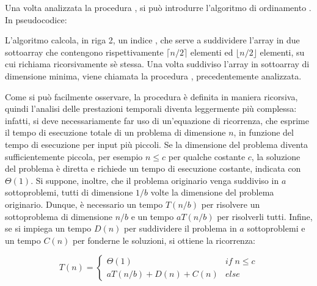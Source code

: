 \vspace{10pt}

Una volta analizzata la procedura , si può introdurre l'algoritmo di ordinamento . In pseudocodice:



L'algoritmo calcola, in riga 2, un indice , che serve a suddividere l'array  in due sottoarray che contengono rispettivamente \(\lceil n/2 \rceil\) elementi ed \(\lfloor n/2 \rfloor\) elementi, su cui richiama ricorsivamente sè stessa. Una volta suddiviso l'array  in sottoarray di dimensione minima, viene chiamata la procedura , precedentemente analizzata. 

Come si può facilmente osservare, la procedura  è definita in maniera ricorsiva, quindi l'analisi delle prestazioni temporali diventa leggermente più complessa: infatti, si deve necessariamente far uso di un'equazione di ricorrenza, che esprime il tempo di esecuzione totale di un problema di dimensione \(n\), in funzione del tempo di esecuzione per input più piccoli. Se la dimensione del problema diventa sufficientemente piccola, per esempio \(n\le c\) per qualche costante \(c\), la soluzione del problema è diretta e richiede un tempo di esecuzione costante, indicata con \(\Theta(1)\). Si suppone, inoltre, che il problema originario venga suddiviso in \(a\) sottoproblemi, tutti di dimensione \(1/b\) volte la dimensione del problema originario. Dunque, è necessario un tempo \(T(n/b)\) per risolvere un sottoproblema di dimensione \(n/b\) e un tempo \(aT(n/b)\) per risolverli tutti. Infine, se si impiega un tempo \(D(n)\) per suddividere il problema in \(a\) sottoproblemi e un tempo \(C(n)\) per fonderne le soluzioni, si ottiene la ricorrenza:

\begin{equation*}
  T(n) = \begin{cases}
    \Theta(1) & if\;n\le c\\
    aT(n/b)+D(n)+C(n) & else
  \end{cases}
\end{equation*}

